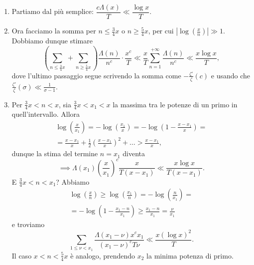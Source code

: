 \begin{enumerate}
  \item Partiamo dal più semplice: $\dfrac{c\Lambda(x)}{T} \ll \dfrac{\log{x}}{T}$.
  \item Ora facciamo la somma per $n \le \frac{3}{4}x$ o $n \ge \frac{5}{4}x$, per cui $\left|\log\left(\frac{x}{n}\right)\right| \gg 1$. Dobbiamo dunque stimare
  $$\left(\sum_{n \le \frac{3}{4}x}+\sum_{n \ge \frac{5}{4}x}\right)\frac{\Lambda(n)}{n^c}\cdot\frac{x^c}{T} \ll \frac{x}{T}\sum_{n=1}^{+\infty} \frac{\Lambda(n)}{n^c} \ll \frac{x\log{x}}{T},$$
  dove l'ultimo passaggio segue scrivendo la somma come $-\frac{\zeta'}{\zeta}(c)$ e usando che $\frac{\zeta'}{\zeta}(\sigma) \ll \frac{1}{\sigma-1}$.
  \item Per $\frac{3}{4}x<n<x$, sia $\frac{3}{4}x<x_1<x$ la massima tra le potenze di un primo in quell'intervallo. Allora
  \begin{gather*}
    \log\left(\frac{x}{x_1}\right)=-\log\left(\frac{x_1}{x}\right)=-\log\left(1-\frac{x-x_1}{x}\right)=\\
    =\frac{x-x_1}{x}+\frac{1}{2}\left(\frac{x-x_1}{x}\right)^2+\dots>\frac{x-x_1}{x},
  \end{gather*}
  dunque la stima del termine $n=x_1$ diventa
  $$\implies \Lambda(x_1)\left(\frac{x}{x_1}\right)^c\frac{x}{T(x-x_1)} \ll \frac{x\log{x}}{T(x-x_1)}.$$
  E $\frac{3}{4}x<n<x_1$? Abbiamo
  \begin{gather*}
    \log\left(\frac{x}{n}\right) \ge \log\left(\frac{x_1}{n}\right)=-\log\left(\frac{n}{x_1}\right)=\\
    =-\log\left(1-\frac{x_1-n}{x_1}\right)
    \ge \frac{x_1-n}{x_1}=\frac{\nu}{x_1}
  \end{gather*}
  e troviamo
  $$\sum_{1 \le \nu <x_1} \frac{\Lambda(x_1-\nu)x^cx_1}{(x_1-\nu)^cT\nu} \ll \frac{x(\log{x})^2}{T}.$$
  Il caso $x<n<\frac{5}{4}x$ è analogo, prendendo $x_2$ la minima potenza di primo.
\end{enumerate}

